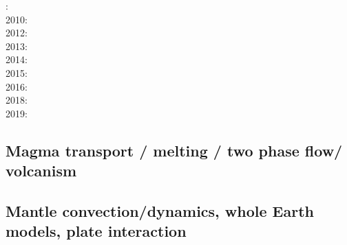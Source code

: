 : \cite{gamc08}\\
2010: \cite{stto10}\\
2012: \cite{stto12}\cite{dagd12}\cite{dect12}\\
2013: \cite{limc13}\cite{bogs13a}\\
2014: \cite{budt14}\\
2015: \cite{musd15}\cite{hafg15}\cite{mczh05a}\\
2016: \cite{dost16}\\
2018: \cite{daga18}\\
2019: \cite{hebo19}

\subsection*{Magma transport / melting / two phase flow/ volcanism}

\cite{scst84}
\cite{scst86}
\cite{scot88}
\cite{spie93}
\cite{bisc95}
\cite{rabg98}
\cite{bers01}
\cite{beri03}
\cite{omma06}
\cite{srrb07}
\cite{bavi09}
\cite{baiv10}
\cite{baiv11}
\cite{yatd12}
\cite{lorg18}
\cite{dagg19}


\subsection*{Mantle convection/dynamics, whole Earth models, plate interaction}

